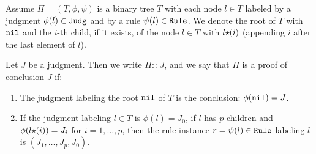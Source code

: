 

\begin{definition}
Assume $\Pi=(T,\phi, \psi)$ is a binary tree $T$ with each node $l \in T$ 
labeled by a judgment $\phi(l) \in {\tt Judg}$ and by a rule $\psi(l) \in {\tt Rule}$. 
We denote the root of $T$ with ${\tt nil}$
and the $i$-th child, if it exists, of the node $l \in T$ with $l {\star} (i)$
(appending $i$ after the last element of $l$).

Let $J$ be a judgment. 
Then we write $\Pi :: J$, and we say that $\Pi$ is a proof of conclusion $J$ if:
\begin{enumerate}
\item 
  The judgment labeling the root ${\tt nil}$ of $T$ is the conclusion: $\phi({\tt nil}) = J$.
\item
  If the judgment labeling $l \in T$ is $\phi(l) = J_0$, if $l$ has $p$ children
  and $\phi(l {\star} (i)) = J_i$ for $i=1, \ldots, p$,
  then the rule instance $r = \psi(l) \in {\tt Rule}$ labeling $l$ is $(J_1,\ldots,J_p,J_0)$.
\end{enumerate}
\end{definition}

%
%

